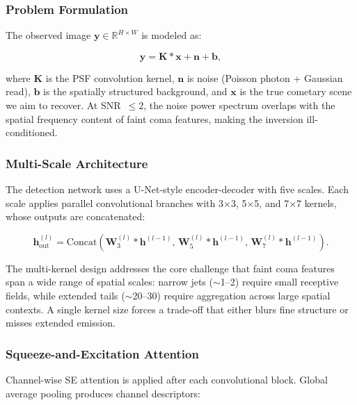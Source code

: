 \documentclass[usenatbib]{mnras}
\begin{document}
\subsubsection{Problem Formulation}

The observed image $\mathbf{y} \in \mathbb{R}^{H \times W}$ is modeled as:

\begin{equation}\label{eq:forward_model}
\mathbf{y} = \mathbf{K} * \mathbf{x} + \mathbf{n} + \mathbf{b},
\end{equation}

where $\mathbf{K}$ is the PSF convolution kernel, $\mathbf{n}$ is noise (Poisson photon + Gaussian read), $\mathbf{b}$ is the spatially structured background, and $\mathbf{x}$ is the true cometary scene we aim to recover. At SNR~$\leq 2$, the noise power spectrum overlaps with the spatial frequency content of faint coma features, making the inversion ill-conditioned.

\subsubsection{Multi-Scale Architecture}

The detection network uses a U-Net-style encoder-decoder \citep{ronneberger15} with five scales. Each scale applies parallel convolutional branches with 3$\times$3, 5$\times$5, and 7$\times$7 kernels, whose outputs are concatenated:

\begin{equation}\label{eq:multi_kernel}
\mathbf{h}_{\text{out}}^{(l)} = \text{Concat}\left(\mathbf{W}_3^{(l)} * \mathbf{h}^{(l-1)},\, \mathbf{W}_5^{(l)} * \mathbf{h}^{(l-1)},\, \mathbf{W}_7^{(l)} * \mathbf{h}^{(l-1)}\right).
\end{equation}

The multi-kernel design addresses the core challenge that faint coma features span a wide range of spatial scales: narrow jets ($\sim$1--2\arcsec) require small receptive fields, while extended tails ($\sim$20--30\arcsec) require aggregation across large spatial contexts. A single kernel size forces a trade-off that either blurs fine structure or misses extended emission.

\subsubsection{Squeeze-and-Excitation Attention}

Channel-wise SE attention \citep{hu18} is applied after each convolutional block. Global average pooling produces channel descriptors:
\end{document}
